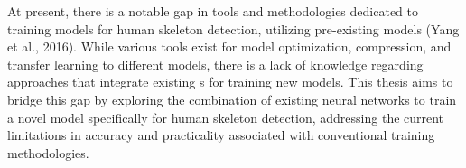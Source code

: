 At present, there is a notable gap in tools and methodologies dedicated to training models for human skeleton detection, utilizing pre-existing models (\scc Yang et al., 2016). While various tools exist for model optimization, compression, and transfer learning to different models, there is a lack of knowledge regarding approaches that integrate existing \NN\-s for training new models. This thesis aims to bridge this gap by exploring the combination of existing neural networks to train a novel model specifically for human skeleton detection, addressing the current limitations in accuracy and practicality associated with conventional training methodologies.

